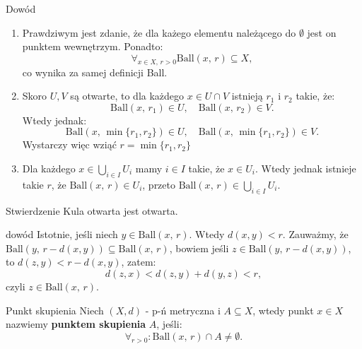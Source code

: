 \documentclass{article}
\newcommand{\ball}[2]{\text{Ball}(#1, \, #2)}
\begin{document}
     \begin{dow}{Dowód}
        \begin{enumerate}
            \item Prawdziwym jest zdanie, że dla każego elementu należącego do $\emptyset$ jest on punktem wewnętrzym. Ponadto: \begin{equation}
                \forall_{x \in X,\, r > 0} \ball{x}{r} \subseteq X,
            \end{equation}
            co wynika za samej definicji Ball.

            \item Skoro $U, V$ są otwarte, to dla każdego $x \in U \cap V$ istnieją $r_1$ i $r_2$ takie, że:\begin{equation*}
                \ball{x}{r_1} \in U, \quad \ball{x}{r_2} \in V.
            \end{equation*} Wtedy jednak: \begin{equation*}
                \ball{x}{\min\{r_1, r_2\}} \in U, \quad \ball{x}{\min\{r_1, r_2\}} \in V.
            \end{equation*} Wystarczy więc wziąć $r = \min\{r_1, r_2\}$

            \item Dla każdego $x \in \bigcup_{i \in I} U_i$ mamy $i \in I$ takie, że $x \in U_i$. Wtedy jednak istnieje takie $r$, że $\ball{x}{r} \in U_i$, przeto $\ball{x}{r} \in \bigcup_{i \in I} U_i$.

        \end{enumerate}

     \end{dow}

     \begin{twier}{Stwierdzenie}
        Kula otwarta jest otwarta.
     \end{twier}

     \begin{dow}{dowód}
        Istotnie, jeśli niech $y \in \ball{x}{r}$. Wtedy $d(x, y) < r$. Zauważmy, że $\ball{y}{r - d(x, y)} \subseteq \ball{x}{r}$, bowiem jeśli $z \in \ball{y}{r - d(x, y)}$, to $d(z, y) < r - d(x, y)$, zatem: \begin{equation*}
            d(z, x) < d(z, y) + d(y, z) < r,
        \end{equation*} czyli $z \in \ball{x}{r}$.
     \end{dow}



     \begin{defr}{Punkt skupienia}
        Niech $(X, d)$ - p-ń metryczna i $A \subseteq X$, wtedy punkt $x \in X$ nazwiemy \textbf{punktem skupienia} $A$, jeśli: \begin{equation}
            \forall_{r>0}: \ball{x}{r} \cap A \neq \emptyset.
        \end{equation}
     \end{defr}
\end{document}

